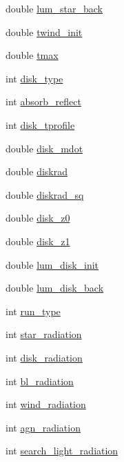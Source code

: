 \begin{DoxyCompactItemize}
\item 
double \hyperlink{structgeometry_a908bbfb132cc0e0fdcd5253dd75234ec}{lum\+\_\+star\+\_\+back}
\item 
double \hyperlink{structgeometry_abb5c7c693f6694c7060addeefc8bc9b8}{twind\+\_\+init}
\item 
double \hyperlink{structgeometry_a54d0a2d5699ed4af1353429a7ec652bb}{tmax}
\item 
int \hyperlink{structgeometry_a17efc849b549c82a01393a50b62315a6}{disk\+\_\+type}
\item 
int \hyperlink{structgeometry_afeadd0bdaa479e2dbc672f7e788080ca}{absorb\+\_\+reflect}
\item 
int \hyperlink{structgeometry_a6303d18fc24435a8be2822e1a98b8747}{disk\+\_\+tprofile}
\item 
double \hyperlink{structgeometry_a45dca7da50031053e3afe2da3bd5aac7}{disk\+\_\+mdot}
\item 
double \hyperlink{structgeometry_a71b7a3a06fb5c18efba2b2642cb8e060}{diskrad}
\item 
double \hyperlink{structgeometry_a88a16d3b999dd6b48db5d132df36b704}{diskrad\+\_\+sq}
\item 
double \hyperlink{structgeometry_abbd420cc3feb4b5e2e50acd27178359a}{disk\+\_\+z0}
\item 
double \hyperlink{structgeometry_a4339ab178af4a987c9f4199d4a543b03}{disk\+\_\+z1}
\item 
double \hyperlink{structgeometry_ae2d821a0a7e482f0c5486a7111531ce5}{lum\+\_\+disk\+\_\+init}
\item 
double \hyperlink{structgeometry_a143da65a7b611a98673b356de0c4509c}{lum\+\_\+disk\+\_\+back}
\item 
int \hyperlink{structgeometry_af65bb6689e1945e975f6787825d2c5b8}{run\+\_\+type}
\item 
int \hyperlink{structgeometry_afa33aaacf8e2a7956bcea9c4e2257f9b}{star\+\_\+radiation}
\item 
int \hyperlink{structgeometry_a3c382f0f9c6d402381b6faeb5b4f216f}{disk\+\_\+radiation}
\item 
int \hyperlink{structgeometry_a25933883c250dfbd51df9f1df808c6d9}{bl\+\_\+radiation}
\item 
int \hyperlink{structgeometry_aff6d34b209264b154fa7bd36266f70de}{wind\+\_\+radiation}
\item 
int \hyperlink{structgeometry_a0be43d0c0f6fd83ef56702359de54512}{agn\+\_\+radiation}
\item 
int \hyperlink{structgeometry_a4721cb9a8471c99730ffc41b7ffde166}{search\+\_\+light\+\_\+radiation}

\end{DoxyCompactItemize}
